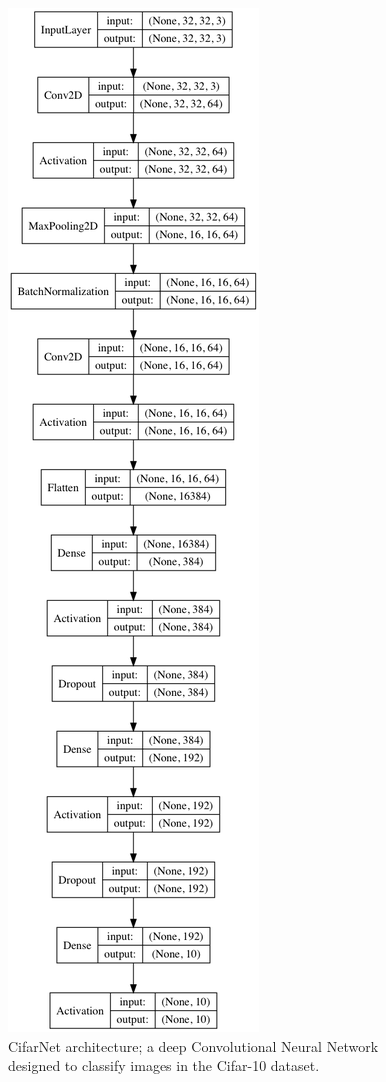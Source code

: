 \documentclass[letterpaper, 10 pt, conference]{ieeeconf}  %
\begin{document}
\begin{figure}[H]
      \centering
      \includegraphics[scale = .3]{cifarnet_model.png}
		\centering
      \caption{CifarNet architecture; a deep Convolutional Neural Network designed to classify images in the Cifar-10 dataset.}
      \label{figurelabel}
\end{figure}
    
\end{document}
